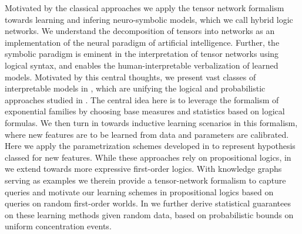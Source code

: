 Motivated by the classical approaches we apply the tensor network formalism towards learning and infering neuro-symbolic models, which we call hybrid logic networks.
We understand the decomposition of tensors into networks as an implementation of the neural paradigm of artificial intelligence.
Further, the symbolic paradigm is eminent in the interpretation of tensor networks using logical syntax, and enables the human-interpretable verbalization of learned models.
Motivated by this central thoughts, we present vast classes of interpretable models in , which are unifying the logical and probabilistic approaches studied in .
The central idea here is to leverage the formalism of exponential families by choosing base measures and statistics based on logical formulas.
We then turn in  towards inductive learning scenarios in this formalism, where new features are to be learned from data and parameters are calibrated.
Here we apply the parametrization schemes developed in  to represent hypothesis classed for new features.
While these approaches rely on propositional logics, in  we extend towards more expressive first-order logics.
With knowledge graphs serving as examples we therein provide a tensor-network formalism to capture queries and motivate our learning schemes in propositional logics based on queries on random first-order worlds.
In  we further derive statistical guarantees on these learning methods given random data, based on probabilistic bounds on uniform concentration events.

